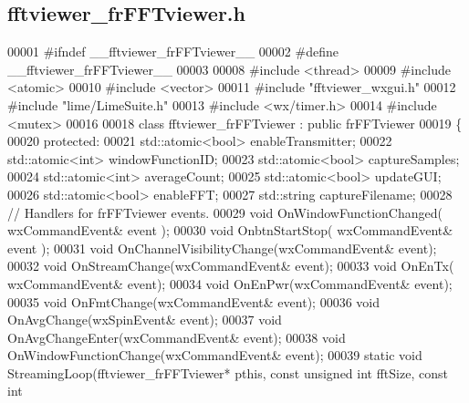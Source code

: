 \subsection{fftviewer\+\_\+fr\+F\+F\+Tviewer.\+h}
\label{fftviewer__frFFTviewer_8h_source}

\begin{DoxyCode}
00001 \textcolor{preprocessor}{#ifndef \_\_fftviewer\_frFFTviewer\_\_}
00002 \textcolor{preprocessor}{#define \_\_fftviewer\_frFFTviewer\_\_}
00003 
00008 \textcolor{preprocessor}{#include <thread>}
00009 \textcolor{preprocessor}{#include <atomic>}
00010 \textcolor{preprocessor}{#include <vector>}
00011 \textcolor{preprocessor}{#include "fftviewer_wxgui.h"}
00012 \textcolor{preprocessor}{#include "lime/LimeSuite.h"}
00013 \textcolor{preprocessor}{#include <wx/timer.h>}
00014 \textcolor{preprocessor}{#include <mutex>}
00016 
00018 \textcolor{keyword}{class }fftviewer_frFFTviewer : \textcolor{keyword}{public} frFFTviewer
00019 \{
00020 \textcolor{keyword}{protected}:
00021     std::atomic<bool> enableTransmitter;
00022     std::atomic<int> windowFunctionID;
00023     std::atomic<bool> captureSamples;
00024     std::atomic<int> averageCount;
00025     std::atomic<bool> updateGUI;
00026     std::atomic<bool> enableFFT;
00027     std::string captureFilename;
00028     \textcolor{comment}{// Handlers for frFFTviewer events.}
00029     \textcolor{keywordtype}{void} OnWindowFunctionChanged( wxCommandEvent& event );
00030     \textcolor{keywordtype}{void} OnbtnStartStop( wxCommandEvent& event );
00031     \textcolor{keywordtype}{void} OnChannelVisibilityChange(wxCommandEvent& event);
00032     \textcolor{keywordtype}{void} OnStreamChange(wxCommandEvent& event);
00033     \textcolor{keywordtype}{void} OnEnTx( wxCommandEvent& event); 
00034     \textcolor{keywordtype}{void} OnEnPwr(wxCommandEvent& event);
00035     \textcolor{keywordtype}{void} OnFmtChange(wxCommandEvent& event);
00036     \textcolor{keywordtype}{void} OnAvgChange(wxSpinEvent& event);
00037     \textcolor{keywordtype}{void} OnAvgChangeEnter(wxCommandEvent& event);
00038     \textcolor{keywordtype}{void} OnWindowFunctionChange(wxCommandEvent& event);
00039     \textcolor{keyword}{static} \textcolor{keywordtype}{void} StreamingLoop(fftviewer_frFFTviewer* pthis, \textcolor{keyword}{const} \textcolor{keywordtype}{unsigned} \textcolor{keywordtype}{int} fftSize, \textcolor{keyword}{const} \textcolor{keywordtype}{int} 

\end{DoxyCode}
